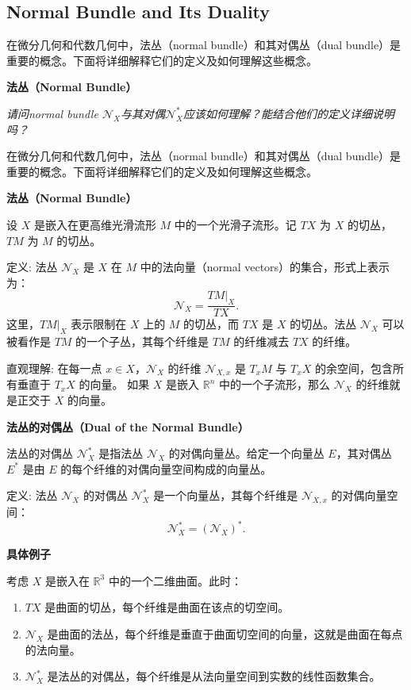 \documentclass[lang=cn,12pt,fontset=none,a4paper]{beautybook}
\begin{document}
\subsection{Normal Bundle and Its Duality}

在微分几何和代数几何中，法丛（{\mont normal bundle}）和其对偶丛（{\cabin dual bundle}）是重要的概念。下面将详细解释它们的定义及如何理解这些概念。

\textbf{法丛（Normal Bundle）}

\textit{请问normal bundle $\mathcal{N}_X$与其对偶$\mathcal{N}_X^*$应该如何理解？能结合他们的定义详细说明吗？}


在微分几何和代数几何中，法丛（normal bundle）和其对偶丛（dual bundle）是重要的概念。下面将详细解释它们的定义及如何理解这些概念。

\textbf{法丛（Normal Bundle）}

设 \( X \) 是嵌入在更高维光滑流形 \( M \) 中的一个光滑子流形。记 \( TX \) 为 \( X \) 的切丛，\( TM \) 为 \( M \) 的切丛。

定义: 法丛 \( \mathcal{N}_X \) 是 \( X \) 在 \( M \) 中的法向量（normal vectors）的集合，形式上表示为：
\[
   \mathcal{N}_X = \frac{TM|_X}{TX}.
\]
这里，\( TM|_X \) 表示限制在 \( X \) 上的 \( M \) 的切丛，而 \( TX \) 是 \( X \) 的切丛。法丛 \( \mathcal{N}_X \) 可以被看作是 \( TM \) 的一个子丛，其每个纤维是 \( TM \) 的纤维减去 \( TX \) 的纤维。

直观理解:
在每一点 \( x \in X \)，\( \mathcal{N}_X \) 的纤维 \( \mathcal{N}_{X,x} \) 是 \( T_x M \) 与 \( T_x X \) 的余空间，包含所有垂直于 \( T_x X \) 的向量。
如果 \( X \) 是嵌入 \( \mathbb{R}^n \) 中的一个子流形，那么 \( \mathcal{N}_X \) 的纤维就是正交于 \( X \) 的向量。

\textbf{法丛的对偶丛（Dual of the Normal Bundle）}

法丛的对偶丛 \( \mathcal{N}_X^* \) 是指法丛 \( \mathcal{N}_X \) 的对偶向量丛。给定一个向量丛 \( E \)，其对偶丛 \( E^* \) 是由 \( E \) 的每个纤维的对偶向量空间构成的向量丛。

定义: 法丛 \( \mathcal{N}_X \) 的对偶丛 \( \mathcal{N}_X^* \) 是一个向量丛，其每个纤维是 \( \mathcal{N}_{X,x} \) 的对偶向量空间：
\[
   \mathcal{N}_X^* = (\mathcal{N}_X)^*.
\]

\textbf{具体例子}

考虑 \( X \) 是嵌入在 \( \mathbb{R}^3 \) 中的一个二维曲面。此时：
\begin{enumerate}
   \item \( TX \) 是曲面的切丛，每个纤维是曲面在该点的切空间。
   \item \( \mathcal{N}_X \) 是曲面的法丛，每个纤维是垂直于曲面切空间的向量，这就是曲面在每点的法向量。
   \item \( \mathcal{N}_X^* \) 是法丛的对偶丛，每个纤维是从法向量空间到实数的线性函数集合。
\end{enumerate}
\end{document}
